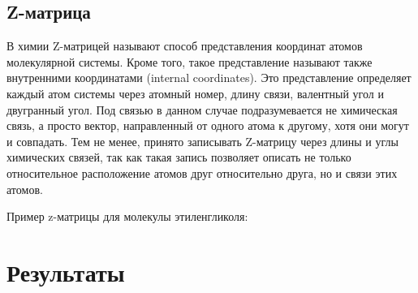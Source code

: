 \subsection{Z-матрица}
В химии Z-матрицей называют способ представления координат атомов молекулярной системы. Кроме того, такое представление называют также внутренними координатами (internal coordinates). Это представление определяет каждый атом системы через атомный номер, длину связи, валентный угол и двугранный угол. Под связью в данном случае подразумевается не химическая связь, а просто вектор, направленный от одного атома к другому, хотя они могут и совпадать. Тем не менее, принято записывать Z-матрицу через длины и углы химических связей, так как такая запись позволяет описать не только относительное расположение атомов друг относительно друга, но и связи этих атомов.

Пример z-матрицы для молекулы этиленгликоля:
\begin{table}[H]
\end{table}


\newpage
\section{Результаты}
